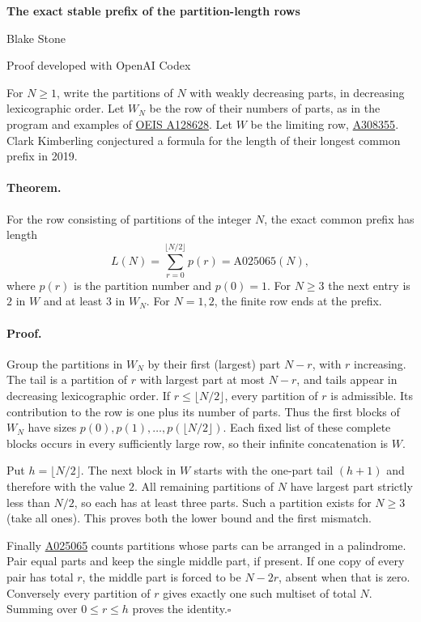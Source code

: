 \documentclass[11pt,letterpaper]{article}
\begin{document}
\begin{center}
{\LARGE\bfseries The exact stable prefix of the partition-length rows}\par\vspace{8pt}
Blake Stone\par{\small Proof developed with OpenAI Codex}
\end{center}
For $N\ge1$, write the partitions of $N$ with weakly decreasing parts, in decreasing lexicographic order. Let $W_N$ be the row of their numbers of parts, as in the program and examples of \href{https://oeis.org/A128628}{OEIS A128628}. Let $W$ be the limiting row, \href{https://oeis.org/A308355}{A308355}. Clark Kimberling conjectured a formula for the length of their longest common prefix in 2019.

\paragraph{Theorem.} For the row consisting of partitions of the integer $N$, the exact common prefix has length
\[
 L(N)=\sum_{r=0}^{\lfloor N/2\rfloor}p(r)=\text{A025065}(N),
\]
where $p(r)$ is the partition number and $p(0)=1$. For $N\ge3$ the next entry is $2$ in $W$ and at least $3$ in $W_N$. For $N=1,2$, the finite row ends at the prefix.

\paragraph{Proof.} Group the partitions in $W_N$ by their first (largest) part $N-r$, with $r$ increasing. The tail is a partition of $r$ with largest part at most $N-r$, and tails appear in decreasing lexicographic order. If $r\le\lfloor N/2\rfloor$, every partition of $r$ is admissible. Its contribution to the row is one plus its number of parts. Thus the first blocks of $W_N$ have sizes $p(0),p(1),\ldots,p(\lfloor N/2\rfloor)$. Each fixed list of these complete blocks occurs in every sufficiently large row, so their infinite concatenation is $W$.

Put $h=\lfloor N/2\rfloor$. The next block in $W$ starts with the one-part tail $(h+1)$ and therefore with the value $2$. All remaining partitions of $N$ have largest part strictly less than $N/2$, so each has at least three parts. Such a partition exists for $N\ge3$ (take all ones). This proves both the lower bound and the first mismatch.

Finally \href{https://oeis.org/A025065}{A025065} counts partitions whose parts can be arranged in a palindrome. Pair equal parts and keep the single middle part, if present. If one copy of every pair has total $r$, the middle part is forced to be $N-2r$, absent when that is zero. Conversely every partition of $r$ gives exactly one such multiset of total $N$. Summing over $0\le r\le h$ proves the identity.\hfill$\square$
\end{document}
